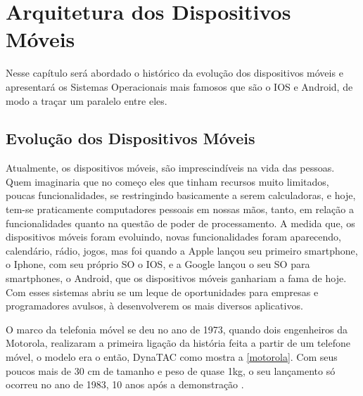 \chapter{\Large{\textbf{Arquitetura dos Dispositivos Móveis}}}
\label{c_cap3}


Nesse  capítulo será abordado o  histórico da evolução dos dispositivos móveis e apresentará os Sistemas Operacionais mais famosos que são o IOS e Android, de modo a traçar um paralelo entre eles.

\section{Evolução dos Dispositivos Móveis}
Atualmente, os dispositivos móveis, são imprescindíveis na vida das pessoas. Quem imaginaria que no começo eles que tinham recursos muito limitados, poucas funcionalidades, se restringindo basicamente a serem calculadoras, e hoje, tem-se praticamente computadores pessoais em nossas mãos, tanto, em relação a funcionalidades quanto na questão de poder de processamento. A medida que, os dispositivos móveis foram evoluindo, novas funcionalidades foram aparecendo, calendário, rádio, jogos, mas foi quando a Apple lançou seu primeiro smartphone, o Iphone, com seu próprio \ac{SO} o IOS, e a Google lançou o seu \ac{SO} para smartphones, o Android, que os dispositivos móveis ganhariam a fama de hoje. Com esses sistemas abriu se um leque de oportunidades para empresas e programadores avulsos, à desenvolverem os mais diversos aplicativos.

O marco da telefonia móvel se deu no ano de 1973, quando dois engenheiros da Motorola, realizaram a primeira ligação da história feita a partir de um telefone móvel, o modelo era o então, DynaTAC como mostra a \autoref{motorola}. Com seus poucos mais  de 30 cm de tamanho e peso de quase 1kg, o seu lançamento só ocorreu no ano de 1983, 10 anos após a demonstração \cite{historia_mobile}.

